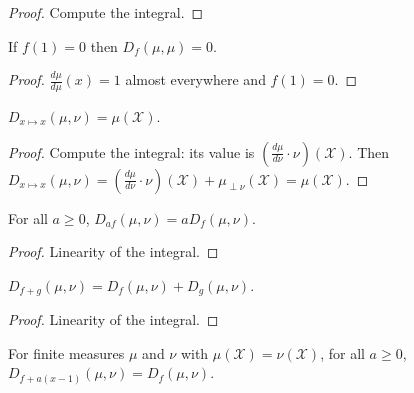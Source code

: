 \begin{proof} \leanok
Compute the integral.
\end{proof}

\begin{lemma}
  \label{lem:fDiv_self}
  \leanok
  If $f(1) = 0$ then $D_{f}(\mu, \mu) = 0$.
\end{lemma}

\begin{proof} \leanok
$\frac{d \mu}{d \mu}(x) = 1$ almost everywhere and $f(1) = 0$.
\end{proof}

\begin{lemma}
  \label{lem:fDiv_id}
  \leanok
  $D_{x \mapsto x}(\mu, \nu) = \mu(\mathcal X)$.
\end{lemma}

\begin{proof} \leanok
Compute the integral: its value is $(\frac{d\mu}{d\nu}\cdot \nu)(\mathcal X)$. Then
$D_{x\mapsto x}(\mu, \nu) = (\frac{d\mu}{d\nu}\cdot \nu)(\mathcal X) + \mu_{\perp \nu}(\mathcal X) = \mu (\mathcal X)$.
\end{proof}

\begin{lemma}
  \label{lem:fDiv_mul}
  \leanok
  For all $a \ge 0$, $D_{a f}(\mu, \nu) = a D_{f}(\mu, \nu)$.
\end{lemma}

\begin{proof}\leanok
Linearity of the integral.
\end{proof}

\begin{lemma}
  \label{lem:fDiv_add}
  \leanok
  $D_{f + g}(\mu, \nu) = D_f(\mu, \nu) + D_g(\mu, \nu)$.
\end{lemma}

\begin{proof}\leanok
Linearity of the integral.
\end{proof}

\begin{lemma}
  \label{lem:fDiv_add_linear}
  \leanok
  For finite measures $\mu$ and $\nu$ with $\mu(\mathcal X) = \nu(\mathcal X)$, for all $a \ge 0$, $D_{f + a(x - 1)}(\mu, \nu) = D_{f}(\mu, \nu)$.
\end{lemma}

